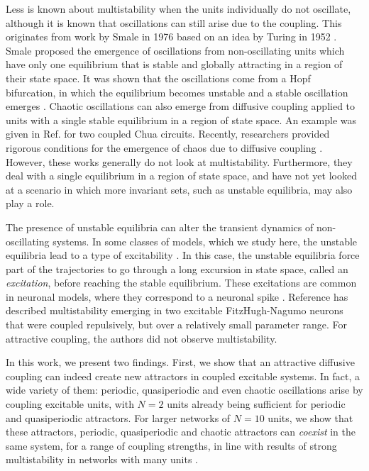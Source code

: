 Less is known about multistability when the units individually do not oscillate, although it is known that oscillations can still arise due to the coupling. This originates from work by Smale in 1976 based on an idea by Turing in 1952 \cite{stankovski2017coupling}. Smale proposed the emergence of oscillations from non-oscillating units which have only one equilibrium that is stable and globally attracting in a region of their state space. It was shown that the oscillations come from a Hopf bifurcation, in which the equilibrium becomes unstable and a stable oscillation emerges \cite{smale1976a, pogromsky1999on}. Chaotic oscillations can also emerge from diffusive coupling applied to units with a single stable equilibrium in a region of state space. An example was given in Ref. \cite{kocarev1995on} for two coupled Chua circuits. Recently, researchers provided rigorous conditions for the emergence of chaos due to diffusive coupling \cite{nijholt2023chaotic}. However, these works generally do not look at multistability. Furthermore, they deal with a single equilibrium in a region of state space, and have not yet looked at a scenario in which more invariant sets, such as unstable equilibria, may also play a role.

The presence of unstable equilibria can alter the transient dynamics of non-oscillating systems. In some classes of models, which we study here, the unstable equilibria lead to a type of excitability \cite{izhikevichbook}. In this case, the unstable equilibria force part of the trajectories to go through a long excursion in state space, called an \textit{excitation}, before reaching the stable equilibrium. These excitations are common in neuronal models, where they correspond to a neuronal spike \cite{izhikevichbook}. Reference \cite{yanagita2005pair} has described multistability emerging in two excitable FitzHugh-Nagumo neurons that were coupled repulsively, but over a relatively small parameter range. For attractive coupling, the authors did not observe multistability. 

In this work, we present two findings. First, we show that an attractive diffusive coupling can indeed create new attractors in coupled excitable systems. In fact, a wide variety of them: periodic, quasiperiodic and even chaotic oscillations arise by coupling excitable units, with $N=2$ units already being sufficient for periodic and quasiperiodic attractors. For larger networks of $N=10$ units, we show that these attractors, periodic, quasiperiodic and chaotic attractors can \textit{coexist} in the same system, for a range of coupling strengths, in line with results of strong multistability in networks with many units \cite{rossi2022shifts, ullner2007multistability, gelbrecht2020monte}.

